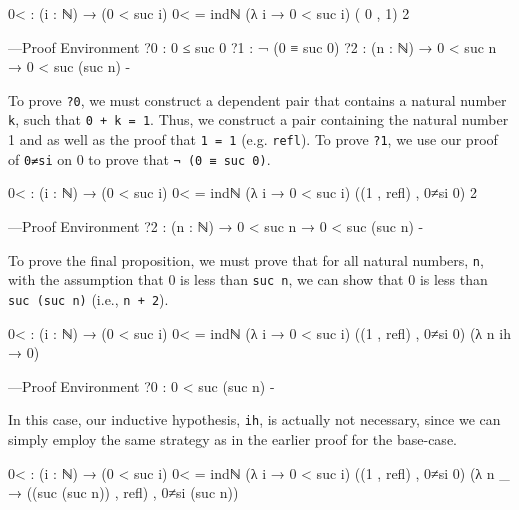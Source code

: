 \documentclass[12pt]{article}
\begin{document}
\begin{code}
0< : (i : ℕ) → (0 < suc i)
0< = indℕ (λ i → 0 < suc i)
          ({ }0 , { }1)
          { }2
  
{---Proof Environment
  ?0 : 0 ≤ suc 0
  ?1 : ¬ (0 ≡ suc 0)
  ?2 : (n : ℕ) → 0 < suc n → 0 < suc (suc n)
-}
\end{code}
To prove {\tt ?0}, we must construct a dependent pair that contains a natural
number {\tt k}, such that {\tt 0 + k = 1}. Thus, we construct a pair containing
the natural number 1 and as well as the proof that {\tt 1 = 1} (e.g. {\tt refl}).
To prove {\tt ?1}, we use our proof of {\tt 0≠si} on 0 to prove that
{\tt ¬ (0 ≡ suc 0)}.
\begin{code}
0< : (i : ℕ) → (0 < suc i)
0< = indℕ (λ i → 0 < suc i)
          ((1 , refl) , 0≠si 0)
          { }2
  
{---Proof Environment
  ?2 : (n : ℕ) → 0 < suc n → 0 < suc (suc n)
-}
\end{code}
To prove the final proposition, we must prove that for all natural numbers, {\tt n},
with the assumption that 0 is less than {\tt suc n}, we can show that 0 is less
than {\tt suc (suc n)} (i.e., {\tt n + 2}). 
\begin{code}
0< : (i : ℕ) → (0 < suc i)
0< = indℕ (λ i → 0 < suc i)
          ((1 , refl) , 0≠si 0)
          (λ n ih → { }0)

{---Proof Environment
  ?0 : 0 < suc (suc n)
-}
\end{code}
In this case, our inductive hypothesis, {\tt ih}, is actually not necessary,
since we can simply employ the same strategy as in the earlier proof for the
base-case.
\begin{code}
  0< : (i : ℕ) → (0 < suc i)
  0< = indℕ (λ i → 0 < suc i)
            ((1 , refl) , 0≠si 0)
            (λ n _ → ((suc (suc n)) , refl) , 0≠si (suc n))

\end{code}
\end{document}
